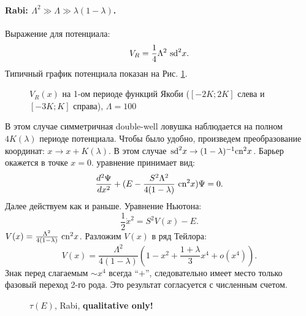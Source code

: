 \documentclass[12pt]{article}
\begin{document}
\paragraph{Rabi: $\Lambda^2 \gg \Lambda \gg \lambda(1 - \lambda)$.}
Выражение для потенциала:
%
\begin{equation}
V_R = \frac{1}{4} \Lambda^2 ~\textrm{sd}^2 x.
\end{equation}
%
Типичный график потенциала показан на Рис. \ref{pic:potential_rabi}.
%
\begin{figure}[Ht!]
\caption{$V_R (x)$ на 1-ом периоде функций Якоби ($[-2K; 2K]$ слева и $[-3K; K]$ справа), $\Lambda = 100$}
\label{pic:potential_rabi}
\end{figure}
%
В этом случае симметричная double-well ловушка наблюдается на полном $4K(\lambda)$ периоде потенциала.
Чтобы было удобно, произведем преобразование координат: $x \to x + K(\lambda)$.
В этом случае $\textrm{sd}^2 x \to (1 - \lambda)^{-1} \textrm{cn}^2 x$.
Барьер окажется в точке $x = 0$.
уравнение принимает вид:
%
\begin{equation}
\frac{d^2 \Psi}{dx^2} + (E - \frac{S^2 \Lambda^2}{4 (1 - \lambda)} ~\textrm{cn}^2 x) \Psi = 0.
\end{equation}
%
Далее действуем как и раньше.
Уравнение Ньютона:
%
\begin{equation}
\frac{1}{2} \dot{x}^2 = S^2 V(x) - E.
\end{equation}
%
$V(x) = \frac{\Lambda^2}{4(1 - \lambda)} ~\textrm{cn}^2 x$.
Разложим $V(x)$ в ряд Тейлора:
%
\begin{equation}
V(x) = \frac{\Lambda^2}{4(1 - \lambda)} (1 - x^2 + \frac{1 + \lambda}{3} x^4 + o(x^4)).
\end{equation}
%
Знак перед слагаемым $\sim x^4$ всегда ``$+$'', следовательно имеет место только фазовый переход 2-го рода.
Это результат согласуется с численным счетом.
%
\begin{figure}[Ht!]
\caption{$\tau(E)$, Rabi, {\bf qualitative only!}}
\end{figure}
%
\end{document}

